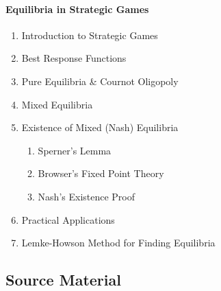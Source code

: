 \documentclass[11pt]{article}
\begin{document}
\paragraph{Equilibria in Strategic Games}
\begin{enumerate}
	\item Introduction to Strategic Games
	\item Best Response Functions
	\item Pure Equilibria \& Cournot Oligopoly
	\item Mixed Equilibria
	\item Existence of Mixed (Nash) Equilibria
	\begin{enumerate}
		\item Sperner's Lemma
		\item Browser's Fixed Point Theory
		\item Nash's Existence Proof
	\end{enumerate}
	\item Practical Applications
	\item Lemke-Howson Method for Finding Equilibria
\end{enumerate}


\subsection*{Source Material}

\end{document}
